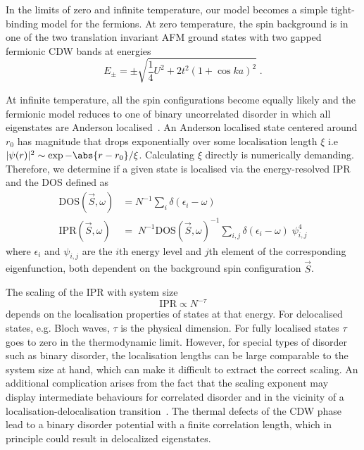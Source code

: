 In the limits of zero and infinite temperature, our model becomes a simple tight-binding model for the fermions. At zero temperature, the spin background is in one of the two translation invariant AFM ground states with two gapped fermionic CDW bands at energies
\[E_{\pm} = \pm\sqrt{\frac{1}{4}U^2 + 2t^2(1 + \cos ka)^2}\;.\]

At infinite temperature, all the spin configurations become equally likely and the fermionic model reduces to one of binary uncorrelated disorder in which all eigenstates are Anderson localised~\cite{abrahamsScalingTheoryLocalization1979}. An Anderson localised state centered around \(r_0\) has magnitude that drops exponentially over some localisation length \(\xi\) i.e \(|\psi(r)|^2 \sim \exp{-\abs{r - r_0}/\xi}\). Calculating $\xi$ directly is numerically demanding. Therefore, we determine if a given state is localised via the energy-resolved \ac{IPR} and the \ac{DOS} defined as
\begin{align}
\mathrm{DOS}(\vec{S}, \omega)& = N^{-1} \sum_{i} \delta(\epsilon_i - \omega)\\
\mathrm{IPR}(\vec{S}, \omega)& = \; N^{-1} \mathrm{DOS}(\vec{S}, \omega)^{-1} \sum_{i,j} \delta(\epsilon_i - \omega)\;\psi^{4}_{i,j}
\end{align}
where \(\epsilon_i\) and \(\psi_{i,j}\) are the \(i\)th energy level and \(j\)th element of the corresponding eigenfunction, both dependent on the background spin configuration \(\vec{S}\). 

The scaling of the IPR with system size
\[\mathrm{IPR} \propto N^{-\tau}\]
depends on the localisation properties of states at that energy. For delocalised states, e.g. Bloch waves, \(\tau\) is the physical dimension. For fully localised states \(\tau\) goes to zero in the thermodynamic limit. However, for special types of disorder such as binary disorder, the localisation lengths can be large comparable to the system size at hand, which can make it difficult to extract the correct scaling. An additional complication arises from the fact that the scaling exponent may display intermediate behaviours for correlated disorder and in the vicinity of a localisation-delocalisation transition~\cite{kramerLocalizationTheoryExperiment1993, eversAndersonTransitions2008a}. The thermal defects of the CDW phase lead to a binary disorder potential with a finite correlation length, which in principle could result in delocalized eigenstates.  


